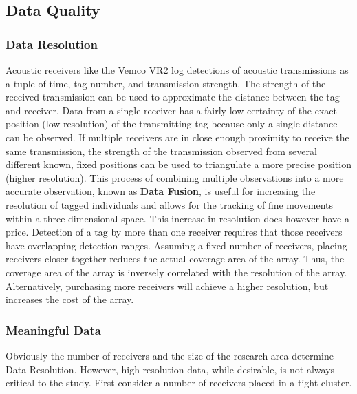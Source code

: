 \subsection{Data Quality}
\label{dataQuality}

\subsubsection{Data Resolution}
\label{dataResolution}
\label{dataFusion}
Acoustic receivers like the Vemco VR2 log detections of acoustic transmissions as a tuple of time, tag number, and transmission strength.  The strength of the received transmission can be used to approximate the distance between the tag and receiver.  Data from a single receiver has a fairly low certainty of the exact position (low resolution) of the transmitting tag because only a single distance can be observed.  If multiple receivers are in close enough proximity to receive the same transmission, the strength of the transmission observed from several different known, fixed positions can be used to triangulate a more precise position (higher resolution).  This process of combining multiple observations into a more accurate observation, known as \textbf{Data Fusion}, is useful for increasing the resolution of tagged individuals and allows for the tracking of fine movements within a three-dimensional space.  This increase in resolution does however have a price.  Detection of a tag by more than one receiver requires that those receivers have overlapping detection ranges.  Assuming a fixed number of receivers, placing receivers closer together reduces the actual coverage area of the array.  Thus, the coverage area of the array is inversely correlated with the resolution of the array.  Alternatively, purchasing more receivers will achieve a higher resolution, but increases the cost of the array.


\subsubsection{Meaningful Data}
\label{meaningfulData}
Obviously the number of receivers and the size of the research area determine Data Resolution.  However, high-resolution data, while desirable, is not always critical to the study.  First consider a number of receivers placed in a tight cluster.

